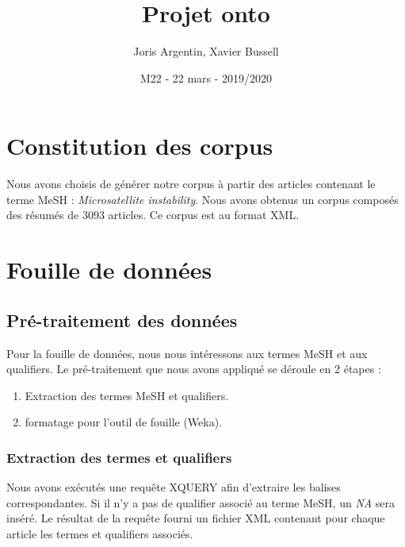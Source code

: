 \documentclass{article}
\title{Projet onto}
\author{Joris Argentin, Xavier Bussell}
\date{M22 - 22 mars - 2019/2020}
\begin{document}
\maketitle

\section{Constitution des corpus}

Nous avons choisis de générer notre corpus à partir des articles contenant le terme MeSH : \emph{Microsatellite instability}.
Nous avons obtenus un corpus composés des résumés de $3093$ articles.
Ce corpus est au format XML.

\section{Fouille de données}

\subsection{Pré-traitement des données}

Pour la fouille de données, nous nous intéressons aux termes MeSH et aux qualifiers.
Le pré-traitement que nous avons appliqué se déroule en 2 étapes :
\begin{enumerate}
    \item Extraction des termes MeSH et qualifiers.
    \item formatage pour l'outil de fouille (Weka).
\end{enumerate}

\subsubsection{Extraction des termes et qualifiers}

Nous avons exécutés une requête XQUERY afin d'extraire les balises correspondantes.
Si il n'y a pas de qualifier associé au terme MeSH, un \emph{NA} sera inséré.
Le résultat de la requête fourni un fichier XML contenant pour chaque article les termes et qualifiers associés.
\end{document}

